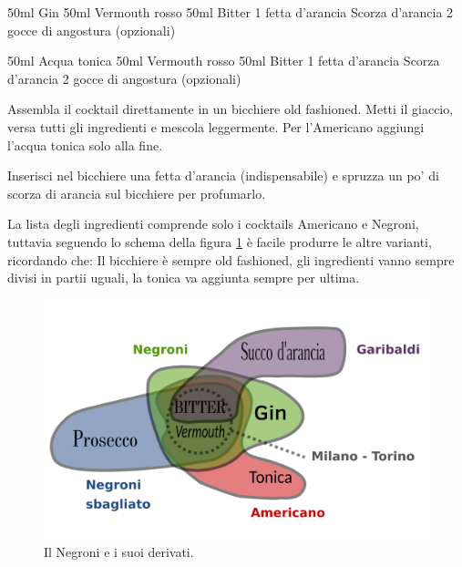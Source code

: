 \cooktime[]{-}%
\begin{ingreds}
\ingredients[Negroni]
	50ml Gin 
	50ml Vermouth rosso 
	50ml Bitter 
	1 fetta d'arancia 
	Scorza d'arancia
	2 gocce di angostura (opzionali) 

\columnbreak

\ingredients[Americano]
	50ml Acqua tonica
	50ml Vermouth rosso
	50ml Bitter
	1 fetta d'arancia
	Scorza d'arancia
	2 gocce di angostura (opzionali)

\end{ingreds}

\begin{method}
Assembla il cocktail direttamente in un bicchiere old fashioned. Metti il giaccio, versa tutti gli ingredienti e mescola leggermente. Per l'Americano aggiungi l'acqua tonica solo alla fine.

Inserisci nel bicchiere una fetta d'arancia (indispensabile) e spruzza un po' di scorza di arancia sul bicchiere per profumarlo.

La lista degli ingredienti comprende solo i cocktails Americano e Negroni, tuttavia seguendo lo schema della figura \ref{negroni:schema} è facile produrre le altre varianti, ricordando che: Il bicchiere è sempre old fashioned, gli ingredienti vanno sempre divisi in partii uguali, la tonica va aggiunta sempre per ultima.
\end{method}


\begin{figure}[!h]
\centering
\includegraphics[]{img/negroni.png}
\caption{Il Negroni e i suoi derivati.}
\label{negroni:schema}
\end{figure}



